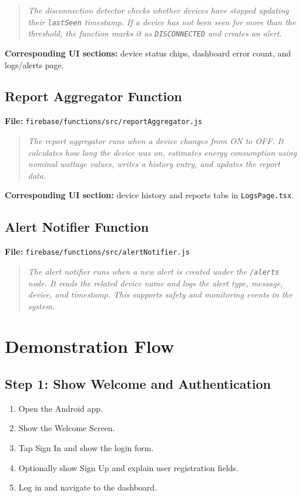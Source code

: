 \documentclass[11pt,a4paper]{article}
\begin{document}
\begin{quote}
\textit{The disconnection detector checks whether devices have stopped updating their \texttt{lastSeen} timestamp. If a device has not been seen for more than the threshold, the function marks it as \texttt{DISCONNECTED} and creates an alert.}
\end{quote}

\textbf{Corresponding UI sections:} device status chips, dashboard error count, and logs/alerts page.

\subsection{Report Aggregator Function}
\textbf{File:} \texttt{firebase/functions/src/reportAggregator.js}

\begin{quote}
\textit{The report aggregator runs when a device changes from ON to OFF. It calculates how long the device was on, estimates energy consumption using nominal wattage values, writes a history entry, and updates the report data.}
\end{quote}

\textbf{Corresponding UI section:} device history and reports tabs in \texttt{LogsPage.tsx}.

\subsection{Alert Notifier Function}
\textbf{File:} \texttt{firebase/functions/src/alertNotifier.js}

\begin{quote}
\textit{The alert notifier runs when a new alert is created under the \texttt{/alerts} node. It reads the related device name and logs the alert type, message, device, and timestamp. This supports safety and monitoring events in the system.}
\end{quote}

\section{Demonstration Flow}

\subsection{Step 1: Show Welcome and Authentication}
\begin{enumerate}
    \item Open the Android app.
    \item Show the Welcome Screen.
    \item Tap Sign In and show the login form.
    \item Optionally show Sign Up and explain user registration fields.
    \item Log in and navigate to the dashboard.
\end{enumerate}
\end{document}
